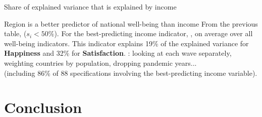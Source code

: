 \documentclass[aspectratio=169,xcolor=dvipsnames, 11pt,mathserif]{beamer}
\begin{document}
\begin{frame}{Share of explained variance that is explained by income \label{share_gdp} \hyperlink{share_gdp_add}{}}
    
\end{frame}

\begin{frame}{Region is a better predictor of national well-being than income}
    \bbvsp
    \ip From the previous table,  ($s_i < 50\%$).
    \ip For the best-predicting income indicator, , on average over all well-being indicators.
    \ip This indicator explains 19\% of the explained variance for \textbf{Happiness} and 32\% for \textbf{Satisfaction}.
    \ip {}: looking at each wave separately, weighting countries by population, dropping pandemic years... \\(including 86\% of 88 specifications involving the best-predicting income variable). \hyperlink{share_gdp_add}{}
    \ee
\end{frame}

\section{Conclusion}
\end{document}
